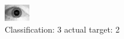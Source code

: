 \begin{figure}[h!]
\begin{center}
\includegraphics[width=0.60\columnwidth]{figures/ID1700_class_3_target_2.png}
\end{center}
\caption{ Classification: 3 actual target: 2}
\label{fig:ID1700_class_3_target_2}
\end{figure}
